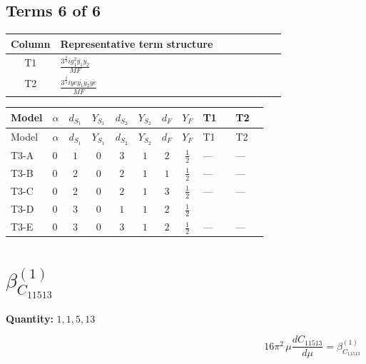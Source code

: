\documentclass[8pt]{article}
\begin{document}
\begin{landscape}
\subsection*{Terms 6 of 6}
\begin{center}
\begin{tabular}{@{}c >{\raggedright\arraybackslash}p{0.82\linewidth}@{}}
\toprule
Column & Representative term structure \\
\midrule
T1 & \(\displaystyle \frac{3^{\frac{3}{4}} i g_{1}^{2} \overline{y_{1}} \overline{y_{2}}}{MF}\) \\
\midrule
T2 & \(\displaystyle \frac{3^{\frac{3}{4}} i ye \overline{y_{1}} \overline{y_{2}} \overline{ye}}{MF}\) \\
\midrule
\bottomrule
\end{tabular}
\end{center}
\smallskip
\tiny
\begin{longtable}{@{}llcccccc >{\raggedright\arraybackslash}p{0.21\linewidth} >{\raggedright\arraybackslash}p{0.21\linewidth}@{}}
\toprule
Model & $\alpha$ & $d_{S_1}$ & $Y_{S_1}$ & $d_{S_2}$ & $Y_{S_2}$ & $d_F$ & $Y_F$ & T1 & T2 \\
\midrule
\endfirsthead
\toprule
Model & $\alpha$ & $d_{S_1}$ & $Y_{S_1}$ & $d_{S_2}$ & $Y_{S_2}$ & $d_F$ & $Y_F$ & T1 & T2 \\
\midrule
\endhead
T3-A & $0$ & $1$ & $0$ & $3$ & $1$ & $2$ & $\frac{1}{2}$ & --- & --- \\
\midrule
T3-B & $0$ & $2$ & $0$ & $2$ & $1$ & $1$ & $\frac{1}{2}$ & --- & --- \\
\midrule
T3-C & $0$ & $2$ & $0$ & $2$ & $1$ & $3$ & $\frac{1}{2}$ & --- & --- \\
\midrule
T3-D & $0$ & $3$ & $0$ & $1$ & $1$ & $2$ & $\frac{1}{2}$ & \scriptsize\adjustbox{max width=\linewidth}{$\begin{gathered} - \frac{3^{\frac{3}{4}} i g_{1}^{2} \overline{y_{1}} \overline{y_{2}}}{8 MF}\end{gathered}$} & \scriptsize\adjustbox{max width=\linewidth}{$\begin{gathered} \frac{3^{\frac{3}{4}} i ye \overline{y_{1}} \overline{y_{2}} \overline{ye}}{12 MF}\end{gathered}$} \\
\midrule
T3-E & $0$ & $3$ & $0$ & $3$ & $1$ & $2$ & $\frac{1}{2}$ & --- & --- \\
\midrule
\bottomrule
\end{longtable}
\clearpage
\section*{$\beta_{C_{11513}}^{(1)}$}
\noindent\textbf{Quantity: }$\mathrm{1,1,5,13}$\par\smallskip
\[16\pi^2\,\mu\frac{d C_{11513}}{d\mu}=\beta_{C_{11513}}^{(1)}\]

\end{landscape}
\end{document}
